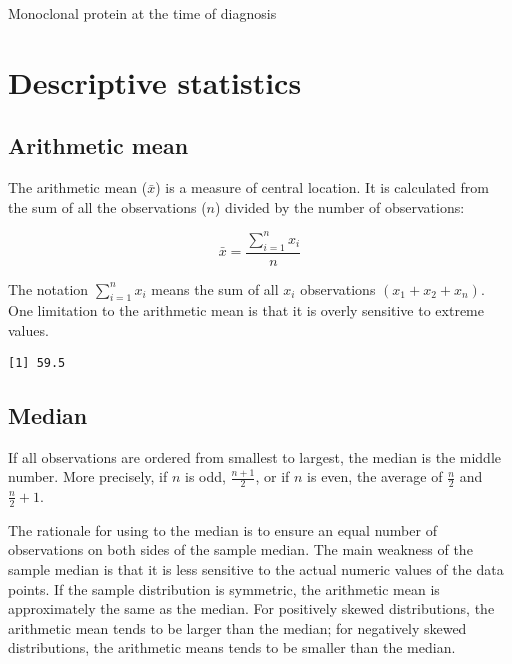 \documentclass[]{book}
\newenvironment{Shaded}{\begin{snugshade}}{\end{snugshade}}
\newcommand{\KeywordTok}[1]{\textcolor[rgb]{0.13,0.29,0.53}{\textbf{#1}}}
\newcommand{\StringTok}[1]{\textcolor[rgb]{0.31,0.60,0.02}{#1}}
\newcommand{\CommentTok}[1]{\textcolor[rgb]{0.56,0.35,0.01}{\textit{#1}}}
\newcommand{\OperatorTok}[1]{\textcolor[rgb]{0.81,0.36,0.00}{\textbf{#1}}}
\newcommand{\NormalTok}[1]{#1}
\theoremstyle{definition}
\theoremstyle{definition}
\theoremstyle{definition}
\theoremstyle{remark}
\begin{document}
Monoclonal protein at the time of diagnosis

\chapter{Descriptive statistics}\label{descriptive-statistics}

\section{Arithmetic mean}\label{arithmetic-mean}

The arithmetic mean (\(\bar{x}\)) is a measure of central location. It
is calculated from the sum of all the observations (\({n}\)) divided by
the number of observations:

\[\bar{x}=\frac{\sum_{i=1}^nx_{i}}{n}\]

The notation \(\sum_{i=1}^nx_{i}\) means the sum of all \({x}_i\)
observations \(({x}_1+{x}_2+{x}_n)\). One limitation to the arithmetic
mean is that it is overly sensitive to extreme values.

\begin{Shaded}
\end{Shaded}

\begin{verbatim}
[1] 59.5
\end{verbatim}

\section{Median}\label{median}

If all observations are ordered from smallest to largest, the median is
the middle number. More precisely, if \({n}\) is odd, \(\frac{n+1}{2}\),
or if \({n}\) is even, the average of \(\frac{n}{2}\) and
\(\frac{n}{2}+1\).

The rationale for using to the median is to ensure an equal number of
observations on both sides of the sample median. The main weakness of
the sample median is that it is less sensitive to the actual numeric
values of the data points. If the sample distribution is symmetric, the
arithmetic mean is approximately the same as the median. For positively
skewed distributions, the arithmetic mean tends to be larger than the
median; for negatively skewed distributions, the arithmetic means tends
to be smaller than the median.
\end{document}
